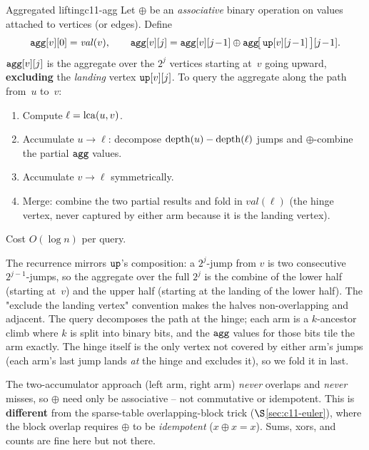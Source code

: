 \begin{theorem}{Aggregated lifting}{c11-agg}
Let \(\oplus\) be an \emph{associative} binary operation on values
attached to vertices (or edges).  Define
\[
  \texttt{agg}[v][0] = \mathit{val}(v), \qquad
  \texttt{agg}[v][j] = \texttt{agg}[v][j\!-\!1] \oplus
                      \texttt{agg}\!\bigl[\,\texttt{up}[v][j\!-\!1]\,\bigr][j\!-\!1].
\]
\(\texttt{agg}[v][j]\) is the aggregate over the \(2^j\) vertices starting
at~\(v\) going upward, \textbf{excluding} the \emph{landing} vertex
\(\texttt{up}[v][j]\).  To query the aggregate along the path from~\(u\)
to~\(v\):
\begin{enumerate}[nosep]
  \item Compute \(\ell = \operatorname{lca}(u,v)\).
  \item Accumulate \(u \to \ell\): decompose \(\operatorname{depth}(u)-\operatorname{depth}(\ell)\)
        jumps and \(\oplus\)-combine the partial \(\texttt{agg}\) values.
  \item Accumulate \(v \to \ell\) symmetrically.
  \item Merge: combine the two partial results and fold in
        \(\mathit{val}(\ell)\) (the hinge vertex, never captured by
        either arm because it is the landing vertex).
\end{enumerate}
Cost \(O(\log n)\) per query.
\end{theorem}

\begin{proofbox}
The recurrence mirrors \(\texttt{up}\)'s composition: a \(2^j\)-jump from
\(v\) is two consecutive \(2^{j-1}\)-jumps, so the aggregate over the
full \(2^j\) is the combine of the lower half (starting at~\(v\)) and the
upper half (starting at the landing of the lower half).  The "exclude the
landing vertex" convention makes the halves non-overlapping and adjacent.
The query decomposes the path at the hinge; each arm is a \(k\)-ancestor
climb where \(k\) is split into binary bits, and the \(\texttt{agg}\)
values for those bits tile the arm exactly.  The hinge itself is the only
vertex not covered by either arm's jumps (each arm's last jump lands
\emph{at} the hinge and excludes it), so we fold it in last.
\end{proofbox}

\begin{notebox}
The two-accumulator approach (left arm, right arm) \emph{never} overlaps
and \emph{never} misses, so \(\oplus\) need only be associative -- not
commutative or idempotent.  This is \textbf{different} from the
sparse-table overlapping-block trick (\(\S\)\ref{sec:c11-euler}), where
the block overlap requires \(\oplus\) to be \emph{idempotent}
(\(x\oplus x = x\)).  Sums, xors, and counts are fine here but not there.
\end{notebox}

